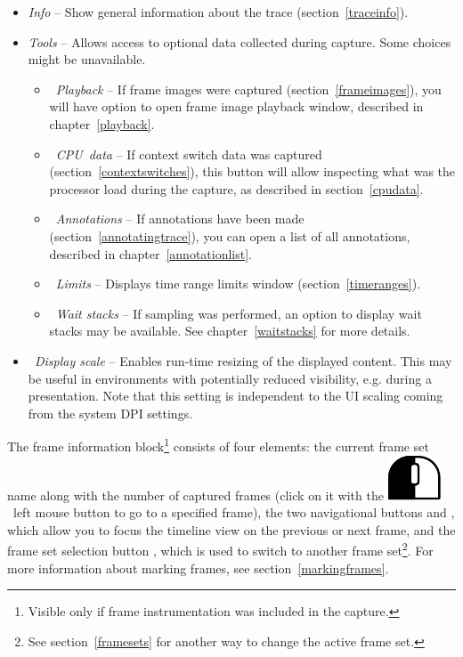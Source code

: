 \documentclass[hidelinks,titlepage,a4paper]{article}
\newcommand{\LMB}{\includegraphics[height=.8\baselineskip]{icons/lmb}}
\begin{document}
\begin{itemize}
\item \emph{\faFingerprint{} Info} -- Show general information about the trace (section~\ref{traceinfo}).
\item \emph{\faTools{} Tools} -- Allows access to optional data collected during capture. Some choices might be unavailable.
\begin{itemize}
\item \emph{\faPlay{}~Playback} -- If frame images were captured (section~\ref{frameimages}), you will have option to open frame image playback window, described in chapter~\ref{playback}.
\item \emph{\faSlidersH{}~CPU~data} -- If context switch data was captured (section~\ref{contextswitches}), this button will allow inspecting what was the processor load during the capture, as described in section~\ref{cpudata}.
\item \emph{\faStickyNote{}~Annotations} -- If annotations have been made (section~\ref{annotatingtrace}), you can open a list of all annotations, described in chapter~\ref{annotationlist}.
\item \emph{\faRuler{}~Limits} -- Displays time range limits window (section~\ref{timeranges}).
\item \emph{\faHourglassHalf{}~Wait stacks} -- If sampling was performed, an option to display wait stacks may be available. See chapter~\ref{waitstacks} for more details.
\end{itemize}
\item \emph{\faSearchPlus{}~Display scale} -- Enables run-time resizing of the displayed content. This may be useful in environments with potentially reduced visibility, e.g. during a presentation. Note that this setting is independent to the UI scaling coming from the system DPI settings.
\end{itemize}

The frame information block\footnote{Visible only if frame instrumentation was included in the capture.} consists of four elements: the current frame set name along with the number of captured frames (click on it with the \LMB{}~left mouse button to go to a specified frame), the two navigational buttons \faCaretLeft{} and \faCaretRight{}, which allow you to focus the timeline view on the previous or next frame, and the frame set selection button \faCaretDown{}, which is used to switch to another frame set\footnote{See section~\ref{framesets} for another way to change the active frame set.}. For more information about marking frames, see section~\ref{markingframes}.
\end{document}
